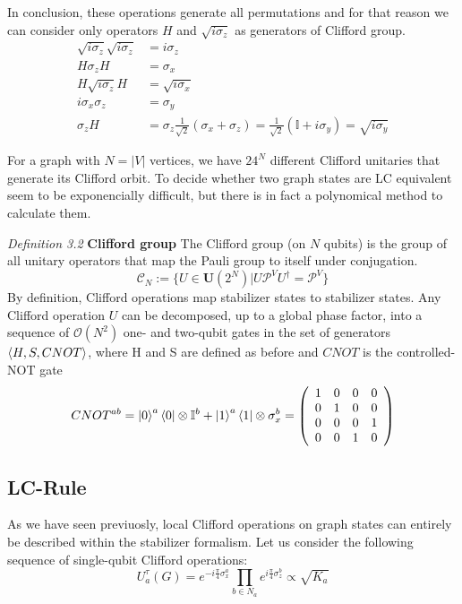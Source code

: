 \documentclass[10pt,a4paper]{book}
\numberwithin{equation}{chapter}
\numberwithin{figure}{chapter}
\numberwithin{table}{chapter}
\begin{document}
In conclusion, these operations generate all permutations and for that reason we can consider only operators $H$ and $\sqrt{i \sigma_{z}}$ as generators of Clifford group.
\begin{align*}
\sqrt{ i \sigma_{z}}\sqrt{ i \sigma_{z}}&= i \sigma_{z} \\
 H\sigma_{z}H &= \sigma_{x} \\
 H\sqrt{ i \sigma_{z}}H &= \sqrt{ i \sigma_{x}} \\ 
 i\sigma_{x}\sigma_{z}&=\sigma_{y} \\
 \sigma_{z}H&= \sigma_{z}\frac{1}{\sqrt{2}}(\sigma_{x}+\sigma_{z}) =\frac{1}{\sqrt{2}}(\mathbb{I}+i\sigma_{y})= \sqrt{ i \sigma_{y}}
\end{align*}

For a graph with $N=|V|$ vertices, we have $24^N$ different Clifford unitaries that generate its Clifford orbit. To decide whether two graph states are LC equivalent seem to be exponencially difficult, but there is in fact a polynomical method to calculate them.

\textit{Definition 3.2} \textbf{Clifford group} The Clifford group (on $N$ qubits) is the group of all unitary operators that map the Pauli group to itself under conjugation.
\begin{equation}
\mathcal{C}_{N}:=\lbrace U \in \textbf{U}(2^N) | U\mathcal{P}^{V}U^{\dagger}=\mathcal{P}^{V} \rbrace
\end{equation}
By definition, Clifford operations map stabilizer states to stabilizer states. Any Clifford operation $U$ can be decomposed, up to a global phase factor, into a sequence of $\mathcal{O}(N^2)$ one- and two-qubit gates in the set of generators $\braket{H,S,CNOT}$, where H and S are defined as before and $CNOT$ is the controlled-NOT gate
$$CNOT^{ab}=\ket{0}^{a}\bra{0}\otimes \mathbb{I}^b + \ket{1}^{a}\bra{1} \otimes \sigma^{b}_x=\left(\begin{array}{cccc}1&0&0&0 \\ 0&1&0&0 \\ 0&0&0&1 \\ 0&0&1&0\\ \end{array}\right)$$
\subsection{LC-Rule}
As we have seen previuosly, local Clifford operations on graph states can entirely be described within the stabilizer formalism. Let us consider the following sequence of single-qubit Clifford operations:
\begin{equation}
U^{\tau}_{a}(G)=e^{-i\frac{\pi}{4}\sigma^{a}_{x}}\prod_{b\in N_a}e^{i\frac{\pi}{4}\sigma^{b}_{z}} \propto \sqrt{K_a}
\label{lcunitary}
\end{equation}
\end{document}
